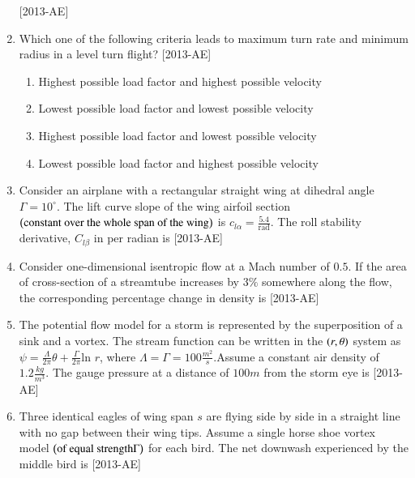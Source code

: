 \documentclass[journal]{IEEEtran}
\begin{document}
\begin{enumerate}[start=27]
    \hfill{[2013-AE]}
\item Which one of the following criteria leads to maximum turn rate and minimum radius in a level turn flight? \hfill{[2013-AE]}
\begin{enumerate}
    \item Highest possible load factor and highest possible velocity
    \item Lowest possible load factor and lowest possible velocity
    \item Highest possible load factor and lowest possible velocity
    \item Lowest possible load factor and highest possible velocity
\end{enumerate}
\item Consider an airplane with a rectangular straight wing at dihedral angle $\Gamma = 10^{\circ}$. The lift curve slope of the wing airfoil section $\left(\text{constant over the whole span of the wing}\right)$ is $c_{l \alpha} = \frac{5.4}{\text{rad}}$. The roll stability derivative, $C_{l \beta}$ in per radian is \underline{\hspace{1cm}} \hfill{[2013-AE]}\\
\item Consider one-dimensional isentropic flow at a Mach number of $0.5$. If the area of cross-section of a streamtube increases by $3\%$ somewhere along the flow, the corresponding percentage change in density is \underline{\hspace{1cm}} \hfill{[2013-AE]}\\
\item The potential flow model for a storm is represented by the superposition of a sink and a vortex. The stream function can be written in the $\left(r,\theta\right)$ system as $\psi=\frac{\Lambda}{2\pi}\theta+\frac{\Gamma}{2\pi} \text{ln } r$, where $\Lambda=\Gamma=100 \frac{m^2}{s}$.Assume a constant air density of $1.2 \frac{kg}{m^3}$. The gauge pressure at a distance of $100 m$ from the storm eye is \hfill{[2013-AE]}
\begin{enumerate}
\end{enumerate}
\item Three identical eagles of wing span $s$ are flying side by side in a straight line with no gap between their wing tips. Assume a single horse shoe vortex model $\left(\text{of equal strength}\Gamma\right)$ for each bird. The net downwash experienced by the middle bird is \hfill{[2013-AE]}

\end{enumerate}
\end{document}
